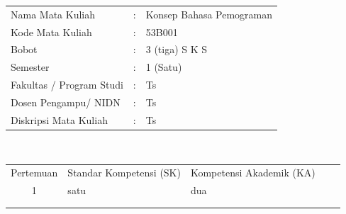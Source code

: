 \documentclass{article}
\begin{document}
\newpage
\begin{table}[h!]
    
    \label{tab:table1}
    \begin{tabular}{l l l}
      Nama Mata Kuliah & : & Konsep Bahasa Pemograman\\
      Kode Mata Kuliah & : & 53B001\\
      Bobot & : & 3 (tiga)  S K S\\
      Semester & : & 1 (Satu)\\
      Fakultas / Program Studi & : & Ts\\
      Dosen Pengampu/ NIDN & : & Ts\\
      Diskripsi Mata Kuliah & : & Ts\\
    \end{tabular}
    \\[50px]
    \begin{tabular}{cllll}
        Pertemuan & Standar Kompetensi (SK) & Kompetensi Akademik (KA) &  &  \\
        1         & satu                    & dua                      &  &  \\
                  &                         &                          &  &  \\
                  &                         &                          &  & 
        \end{tabular}
  \end{table}
\end{document}

